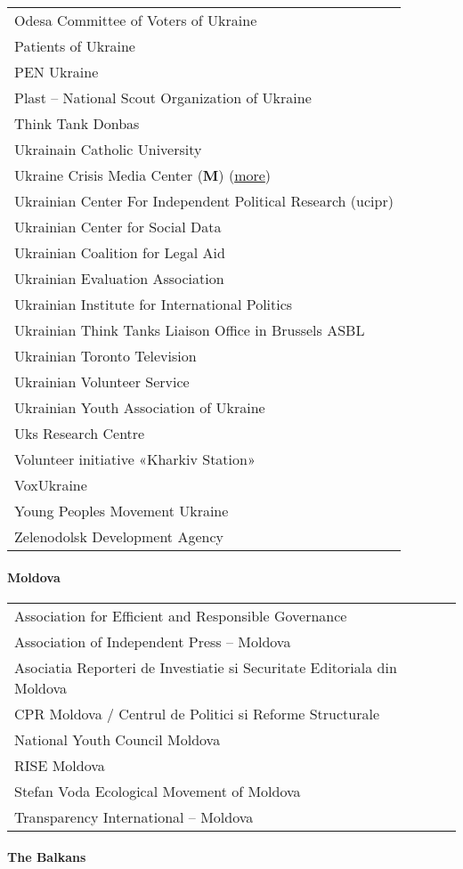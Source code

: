 \begin{longtable}[]{@{}l@{}}
Odesa Committee of Voters of Ukraine\tabularnewline
Patients of Ukraine\tabularnewline
PEN Ukraine\tabularnewline
Plast -- National Scout Organization of Ukraine\tabularnewline
Think Tank Donbas\tabularnewline
Ukrainain Catholic University\tabularnewline
Ukraine Crisis Media Center (\textbf{M})
(\href{https://en.wikipedia.org/wiki/Ukraine_Crisis_Media_Center}{more})\tabularnewline
Ukrainian Center For Independent Political Research
(ucipr)\tabularnewline
Ukrainian Center for Social Data\tabularnewline
Ukrainian Coalition for Legal Aid\tabularnewline
Ukrainian Evaluation Association\tabularnewline
Ukrainian Institute for International Politics\tabularnewline
Ukrainian Think Tanks Liaison Office in Brussels ASBL\tabularnewline
Ukrainian Toronto Television\tabularnewline
Ukrainian Volunteer Service\tabularnewline
Ukrainian Youth Association of Ukraine\tabularnewline
Uks Research Centre\tabularnewline
Volunteer initiative «Kharkiv Station»\tabularnewline
VoxUkraine\tabularnewline
Young Peoples Movement Ukraine\tabularnewline
Zelenodolsk Development Agency\tabularnewline
\bottomrule
\end{longtable}

\hypertarget{moldova}{%
\paragraph{Moldova}\label{moldova}}

\begin{longtable}[]{@{}l@{}}
\toprule
\endhead
Association for Efficient and Responsible Governance\tabularnewline
Association of Independent Press -- Moldova\tabularnewline
Asociatia Reporteri de Investiatie si Securitate Editoriala din
Moldova\tabularnewline
CPR Moldova / Centrul de Politici si Reforme Structurale\tabularnewline
National Youth Council Moldova\tabularnewline
RISE Moldova\tabularnewline
Stefan Voda Ecological Movement of Moldova\tabularnewline
Transparency International -- Moldova\tabularnewline
\bottomrule
\end{longtable}

\hypertarget{the-balkans}{%
\paragraph{The Balkans}\label{the-balkans}}


